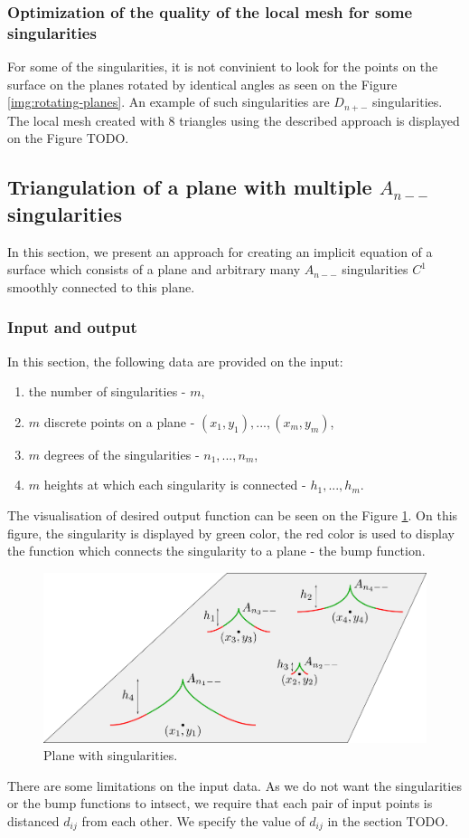 \subsubsection*{Optimization of the quality of the local mesh for some singularities}
For some of the singularities, it is not convinient to look for the points on
the surface on the planes rotated by identical angles as seen on the Figure
\ref{img:rotating-planes}. An example of such singularities are $D_{n+-}$
singularities. The local mesh created with 8 triangles using the described 
approach is displayed on the Figure TODO. 

\subsection*{Triangulation of a plane with multiple $A_{n--}$ singularities}
In this section, we present an approach for creating an implicit equation of a
surface which consists of a plane and arbitrary many $A_{n--}$ singularities
$C^1$ smoothly connected to this plane. 
\subsubsection*{Input and output}
In this section, the following data are provided on the input:
\begin{enumerate}
    \item the number of singularities - $m$,
    \item $m$ discrete points on a plane - $(x_1, y_1), ..., (x_m, y_m)$,
    \item $m$ degrees of the singularities - $n_1, ..., n_m$,
    \item $m$ heights at which each singularity is connected - $h_1, ..., h_m$.
\end{enumerate}
The visualisation of desired output function can be seen on the Figure \ref{img:22}. 
On this figure, the singularity is displayed by green color, the red color is used to
display the function which connects the singularity to a plane - the bump function.
\begin{figure}
    \centerline{\includegraphics[scale=0.5]{images/img22}}
    \caption[Plane with singularities.]
    {Plane with singularities.}
    \label{img:22}
\end{figure}
There are some limitations on the input data. As we do not want the singularities 
or the bump functions to intsect, we require that each pair of input points is
distanced $d_{ij}$ from each other. We specify the value of $d_{ij}$ in the section TODO.
